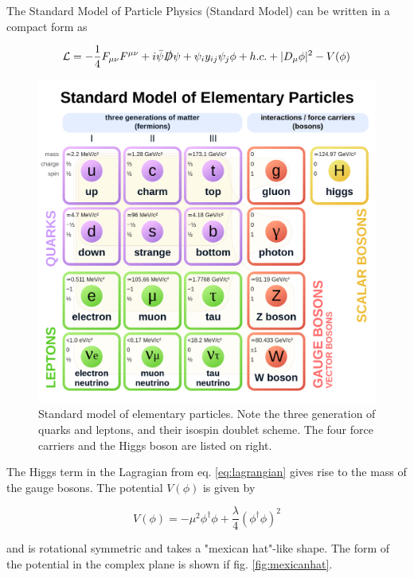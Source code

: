 

The Standard Model of Particle Physics (Standard Model) can be written in a compact form as

\begin{equation}
	\mathcal{L} = -\frac{1}{4}F_{\mu\nu}F^{\mu\nu} + i \bar{\psi}\slashed{D}\psi + \psi_iy_{ij}\psi_j\phi + h.c. + |D_\mu\phi|^2 - V(\phi)
	\label{eq:lagrangian}
\end{equation}

\begin{figure}[h!]
	\centering
	\includegraphics[width=0.6\linewidth]{figures/theory/sm.png}
	\caption{Standard model of elementary particles. Note the three generation of quarks and leptons, and their isospin doublet scheme. The four force carriers and the Higgs boson are listed on right. \cite{enwiki:1101993746}}
	\label{fig:sm}
\end{figure}

The Higgs term in the Lagragian from eq. \ref{eq:lagrangian} gives rise to the mass of the gauge bosons. The potential $V(\phi)$ is given by

\begin{equation*}
	V(\phi) = -\mu^2 \phi^\dagger \phi + \frac{\lambda}{4}\left(\phi^\dagger\phi\right)^2 
\end{equation*}

and is rotational symmetric and takes a "mexican hat"-like shape. The form of the potential in the complex plane is shown if fig. \ref{fig:mexicanhat}.

